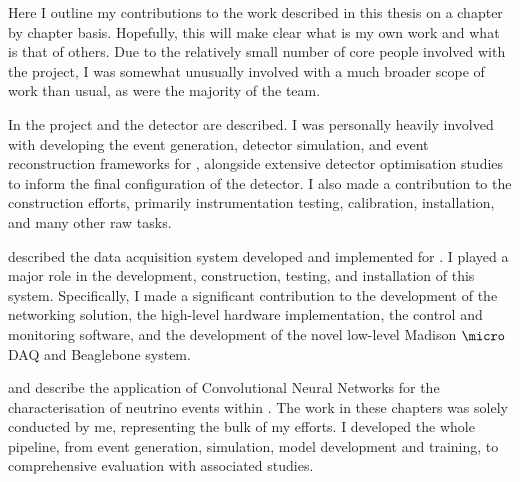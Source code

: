 \begin{preface}
    Here I outline my contributions to the work described in this thesis on a chapter by chapter
    basis. Hopefully, this will make clear what is my own work and what is that of others. Due to
    the relatively small number of core people involved with the \chips project,  I was somewhat
    unusually involved with a much broader scope of work than usual, as were the majority of the
    \chips team.

    In  the \chips project and the \chipsfive detector are described. I was
    personally heavily involved with developing the event generation, detector simulation, and
    event reconstruction frameworks for \chips, alongside extensive detector optimisation studies
    to inform the final configuration of the \chipsfive detector. I also made a contribution to
    the \chipsfive construction efforts, primarily instrumentation testing, calibration,
    installation, and many other raw tasks.
    
     described the data acquisition system developed and implemented for
    \chipsfive. I played a major role in the development, construction, testing, and installation
    of this system. Specifically, I made a significant contribution to the development of the
    networking solution, the high-level hardware implementation, the control and monitoring
    software, and the development of the novel low-level Madison $\micro$DAQ and Beaglebone
    system.
    
     and  describe the application of Convolutional
    Neural Networks for the characterisation of neutrino events within \chipsfive. The work in
    these chapters was solely conducted by me, representing the bulk of my efforts. I developed
    the whole pipeline, from event generation, simulation, model development and training, to
    comprehensive evaluation with associated studies.
\end{preface}

\tableofcontents %